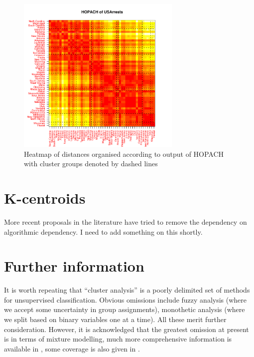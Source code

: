 \begin{figure}
\begin{center}
\includegraphics[width = 0.7\textwidth]{images/hopach}
\caption{Heatmap of distances organised according to output of HOPACH with cluster groups denoted by dashed lines}
\label{hopach}
\end{center}
\end{figure}

\section{K-centroids}

More recent proposals in the literature have tried to remove the dependency on algorithmic dependency.   I need to add something on this shortly.



\section{Further information}

It is worth repeating that ``cluster analysis'' is a poorly delimited set of methods for unsupervised classification.   Obvious omissions include fuzzy analysis (where we accept some uncertainty in group assignments), monothetic analysis (where we split based on binary variables one at a time).   All these merit further consideration.   However, it is acknowledged that the greatest omission at present is in terms of mixture modelling, much more comprehensive information is available in \cite{McLachlan+Peel:2000}, some coverage is also given in \cite{Flury:1997}.



